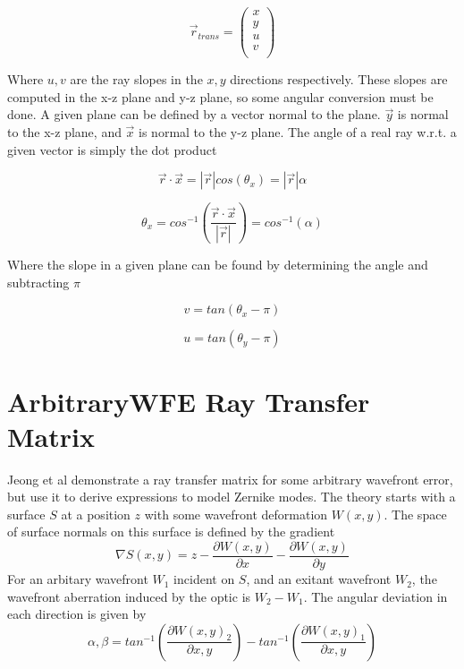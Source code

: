 \documentclass{article}
\begin{document}
	\begin{equation}
		\vec{r}_{trans} = 
		\begin{pmatrix}
			x \\
			y \\
			u \\
			v \\
		\end{pmatrix}
	\end{equation}
	
	Where $u,v$ are the ray slopes in the $x,y$ directions respectively. These slopes are computed in the x-z plane and y-z plane, so some angular conversion must be done. A given plane can be defined by a vector normal to the plane. $\vec{y}$ is normal to the x-z plane, and $\vec{x}$ is normal to the y-z plane. The angle of a real ray w.r.t. a given vector is simply the dot product
	
	\begin{equation}
		\vec{r}\cdot\vec{x} = |\vec{r}|cos(\theta_{x}) = |\vec{r}|\alpha
	\end{equation}
	
	\begin{equation}
		\theta_x = cos^{-1}(\frac{\vec{r}\cdot\vec{x}}{|\vec{r}|}) = cos^{-1}(\alpha)
	\end{equation}
	
	Where the slope in a given plane can be found by determining the angle and subtracting $\pi$
	
	\begin{equation}
		v = tan(\theta_x - \pi)
	\end{equation}
	
	\begin{equation}
		u = tan(\theta_y - \pi)
	\end{equation}
	
	\section{ArbitraryWFE Ray Transfer Matrix}
	
	Jeong et al demonstrate a ray transfer matrix for some arbitrary wavefront error, but use it to derive expressions to model Zernike modes. The theory starts with a surface $S$ at a position $z$ with some wavefront deformation $W(x,y)$. The space of surface normals on this surface is defined by the gradient
	\begin{equation}
		\nabla S(x,y) = z - \frac{\partial W(x,y)}{\partial x} - \frac{\partial W(x,y)}{\partial y}
	\end{equation}
	For an arbitary wavefront $W_{1}$ incident on $S$, and an exitant wavefront $W_{2}$, the wavefront aberration induced by the optic is $W_{2} - W_{1}$. The angular deviation in each direction is given by
	\begin{equation}
		\alpha,\beta = tan^{-1}(\frac{\partial W(x,y)_{2}}{\partial x,y}) - tan^{-1}(\frac{\partial W(x,y)_{1}}{\partial x,y})
	\end{equation}
	
\end{document}
